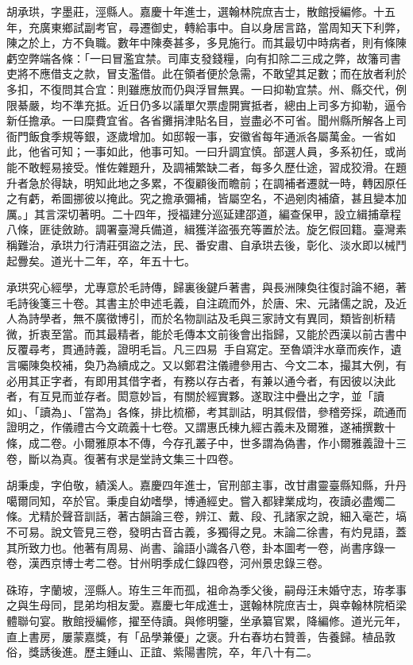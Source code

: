 \begin{pinyinscope}
胡承珙，字墨莊，涇縣人。嘉慶十年進士，選翰林院庶吉士，散館授編修。十五年，充廣東鄉試副考官，尋遷御史，轉給事中。自以身居言路，當周知天下利弊，陳之於上，方不負職。數年中陳奏甚多，多見施行。而其最切中時病者，則有條陳虧空弊端各條：「一曰冒濫宜禁。司庫支發錢糧，向有扣除二三成之弊，故籓司書吏將不應借支之款，冒支濫借。此在領者便於急需，不敢望其足數；而在放者利於多扣，不復問其合宜：則雖應放而仍與浮冒無異。一曰抑勒宜禁。州、縣交代，例限綦嚴，均不準充抵。近日仍多以議單欠票虛開實抵者，總由上司多方抑勒，逼令新任擔承。一曰糜費宜省。各省攤捐津貼名目，豈盡必不可省。聞州縣所解各上司衙門飯食季規等銀，逐歲增加。如邸報一事，安徽省每年通派各屬萬金。一省如此，他省可知；一事如此，他事可知。一曰升調宜慎。部選人員，多系初任，或尚能不敢輕易接受。惟佐雜題升，及調補繁缺二者，每多久歷仕途，習成狡滑。在題升者急於得缺，明知此地之多累，不復顧後而瞻前；在調補者遷就一時，轉因原任之有虧，希圖挪彼以掩此。究之擔承彌補，皆屬空名，不過剜肉補瘡，甚且變本加厲。」其言深切著明。二十四年，授福建分巡延建邵道，編查保甲，設立緝捕章程八條，匪徒斂跡。調署臺灣兵備道，緝獲洋盜張充等置於法。旋乞假回籍。臺灣素稱難治，承珙力行清莊弭盜之法，民、番安肅、自承珙去後，彰化、淡水即以械鬥起釁矣。道光十二年，卒，年五十七。

承珙究心經學，尤專意於毛詩傳，歸裏後鍵戶著書，與長洲陳奐往復討論不絕，著毛詩後箋三十卷。其書主於申述毛義，自注疏而外，於唐、宋、元諸儒之說，及近人為詩學者，無不廣徵博引，而於名物訓詁及毛與三家詩文有異同，類皆剖析精微，折衷至當。而其最精者，能於毛傳本文前後會出指歸，又能於西漢以前古書中反覆尋考，貫通詩義，證明毛旨。凡三四易，手自寫定。至魯頌泮水章而疾作，遺言囑陳奐校補，奐乃為續成之。又以鄭君注儀禮參用古、今文二本，撮其大例，有必用其正字者，有即用其借字者，有務以存古者，有兼以通今者，有因彼以決此者，有互見而並存者。閎意妙旨，有關於經實夥。遂取注中疊出之字，並「讀如」、「讀為」、「當為」各條，排比梳櫛，考其訓詁，明其假借，參稽旁採，疏通而證明之，作儀禮古今文疏義十七卷。又謂惠氏棟九經古義未及爾雅，遂補撰數十條，成二卷。小爾雅原本不傳，今存孔叢子中，世多謂為偽書，作小爾雅義證十三卷，斷以為真。復著有求是堂詩文集三十四卷。

胡秉虔，字伯敬，績溪人。嘉慶四年進士，官刑部主事，改甘肅靈臺縣知縣，升丹噶爾同知，卒於官。秉虔自幼嗜學，博通經史。嘗入都肄業成均，夜讀必盡燭二條。尤精於聲音訓話，著古韻論三卷，辨江、戴、段、孔諸家之說，細入毫芒，塙不可易。說文管見三卷，發明古音古義，多獨得之見。末論二徐書，有灼見語，蓋其所致力也。他著有周易、尚書、論語小識各八卷，卦本圖考一卷，尚書序錄一卷，漢西京博士考二卷。甘州明季成仁錄四卷，河州景忠錄三卷。

硃珔，字蘭坡，涇縣人。珔生三年而孤，祖命為季父後，嗣母汪未婚守志，珔孝事之與生母同，昆弟均相友愛。嘉慶七年成進士，選翰林院庶吉士，與幸翰林院栢梁體聯句宴。散館授編修，擢至侍讀。與修明鑒，坐承纂官累，降編修。道光元年，直上書房，屢蒙嘉獎，有「品學兼優」之褒。升右春坊右贊善，告養歸。植品敦俗，獎誘後進。歷主鍾山、正誼、紫陽書院，卒，年八十有二。


\end{pinyinscope}
